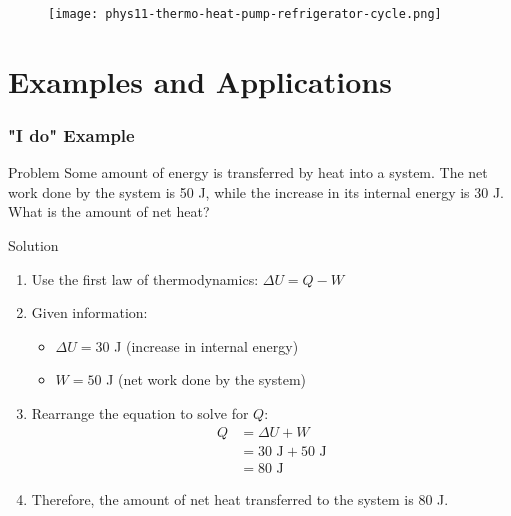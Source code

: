\documentclass{beamer}
\begin{document}
\begin{frame}
\begin{figure}
    \centering
    \texttt{[image: phys11-thermo-heat-pump-refrigerator-cycle.png]}
\end{figure}
\end{frame}
\section{Examples and Applications}

\begin{frame}
    \frametitle{"I do" Example}
    \begin{block}{Problem}
        Some amount of energy is transferred by heat into a system. The net work done by the system is 50 J, while the increase in its internal energy is 30 J. What is the amount of net heat?
    \end{block}
    \end{frame}

\begin{frame}
    \begin{exampleblock}{Solution}
        \begin{enumerate}
            \item Use the first law of thermodynamics: $\Delta U = Q - W$
            \item Given information:
            \begin{itemize}
                \item $\Delta U = 30$ J (increase in internal energy)
                \item $W = 50$ J (net work done by the system)
            \end{itemize}
            
            \item Rearrange the equation to solve for $Q$:
            \begin{align*}
                Q &= \Delta U + W\\
                &= 30 \text{ J} + 50 \text{ J}\\
                &= 80 \text{ J}
            \end{align*}
            
            \item Therefore, the amount of net heat transferred to the system is 80 J.
        \end{enumerate}
    \end{exampleblock}
\end{frame}
\end{document}
